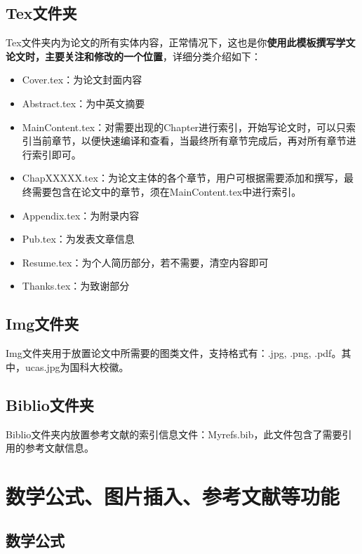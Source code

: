 \subsection{Tex文件夹}

Tex文件夹内为论文的所有实体内容，正常情况下，这也是你\textbf{使用此模板撰写学文论文时，主要关注和修改的一个位置}，详细分类介绍如下：

\begin{itemize}
  \item Cover.tex：为论文封面内容
  \item Abstract.tex：为中英文摘要
  \item Main\textunderscore Content.tex：对需要出现的Chapter进行索引，开始写论文时，可以只索引当前章节，以便快速编译和查看，当最终所有章节完成后，再对所有章节进行索引即可。
  \item Chap\textunderscore XXXXX.tex：为论文主体的各个章节，用户可根据需要添加和撰写，最终需要包含在论文中的章节，须在Main\textunderscore Content.tex中进行索引。
  \item Appendix.tex：为附录内容
  \item Pub.tex：为发表文章信息
  \item Resume.tex：为个人简历部分，若不需要，清空内容即可
  \item Thanks.tex：为致谢部分
\end{itemize}

\subsection{Img文件夹}

Img文件夹用于放置论文中所需要的图类文件，支持格式有：.jpg, .png, .pdf。其中，ucas.jpg为国科大校徽。

\subsection{Biblio文件夹}

Biblio文件夹内放置参考文献的索引信息文件：Myrefs.bib，此文件包含了需要引用的参考文献信息。

\section{数学公式、图片插入、参考文献等功能}

\subsection{数学公式}

